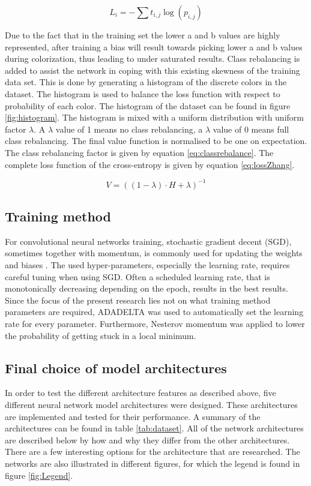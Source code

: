 \begin{equation}
\label{eq:crossentropy}
L_{i} = -\sum t_{i,j}\log(p_{i,j})
\end{equation}

Due to the fact that in the training set the lower a and b values are highly represented, after training a bias will result towards picking lower a and b values during colorization, thus leading to under saturated results. 
Class rebalancing is added to assist the network in coping with this existing skewness of the training data set. This is done by generating a histogram of the discrete colors in the dataset. The histogram is used to balance the loss function with respect to probability of each color. The histogram of the dataset can be found in figure \ref{fig:histogram}. The  histogram is mixed with a uniform distribution with uniform factor $\lambda$. A $\lambda$ value of 1 means no class rebalancing, a $\lambda$ value of 0 means full class rebalancing. The final value function is normalised to be one on expectation. The class rebalancing factor is given by equation \ref{eq:classrebalance}. The complete loss function of the cross-entropy is given by equation \ref{eq:lossZhang}.

\begin{equation}\label{eq:classrebalance}
V = ((1 - \lambda)\cdot H + \lambda)^{-1}
\end{equation}
 
\subsection{Training method}
For convolutional neural networks training, stochastic gradient decent (SGD), sometimes together with momentum, is commonly used for updating the weights and biases \cite{IizukaSIGGRAPH2016}\cite{Simonyan}. The used hyper-parameters, especially the learning rate, requires careful tuning when using SGD. Often a scheduled learning rate, that is monotonically decreasing depending on the epoch, results in the best results. Since the focus of the present research lies not on what training method parameters are required, ADADELTA was used to automatically set the learning rate for every parameter\cite{zeiler2012adadelta}. Furthermore, Nesterov momentum was applied to lower the probability of getting stuck in a local minimum\cite{sutskever2013importance}.

\subsection{Final choice of model architectures}
In order to test the different architecture features as described above, five different neural network model architectures were designed. These architectures are implemented and tested for their performance. A summary of the architectures can be found in table \ref{tab:dataset}. All of the network architectures are described below by how and why they differ from the other architectures. There are a few interesting options for the architecture that are researched. The networks are also illustrated in different figures, for which the legend is found in figure \ref{fig:Legend}.

